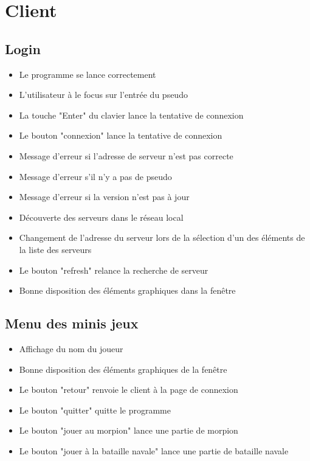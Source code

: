 \documentclass{report}
\begin{document}
\section{Client}
\subsection{Login}
\begin{itemize}
  \item Le programme se lance correctement
  \item L'utilisateur à le focus sur l'entrée du pseudo
  \item La touche "Enter" du clavier lance la tentative de connexion
  \item Le bouton "connexion" lance la tentative de connexion
  \item Message d'erreur si l'adresse de serveur n'est pas correcte
  \item Message d'erreur s'il n'y a pas de pseudo
  \item Message d'erreur si la version n'est pas à jour
  \item Découverte des serveurs dans le réseau local
  \item Changement de l'adresse du serveur lors de la sélection d'un des éléments de la liste des serveurs
  \item Le bouton "refresh" relance la recherche de serveur
  \item Bonne disposition des éléments graphiques dans la fenêtre

\end{itemize}

\subsection{Menu des minis jeux}
\begin{itemize}
  \item Affichage du nom du joueur
  \item Bonne disposition des éléments graphiques de la fenêtre
  \item Le bouton "retour" renvoie le client à la page de connexion
  \item Le bouton "quitter" quitte le programme
  \item Le bouton "jouer au morpion" lance une partie de morpion
  \item Le bouton "jouer à la bataille navale" lance une partie de bataille navale
\end{itemize}
\end{document}
